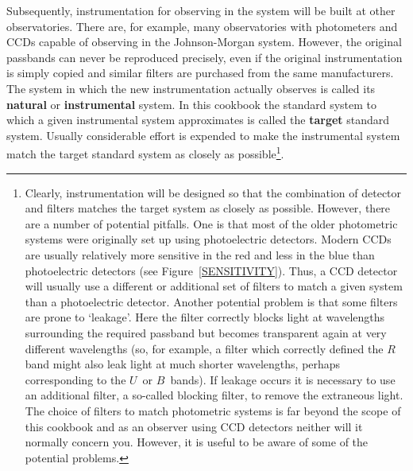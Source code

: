 \documentclass[twoside,11pt]{article}
\begin{document}
Subsequently, instrumentation for observing in the system will be built
at other observatories.  There are, for example, many observatories
with photometers and CCDs capable of observing in the Johnson-Morgan
system.  However, the original passbands can never be reproduced
precisely, even if the original instrumentation is simply copied and
similar filters are purchased from the same manufacturers.  The system
in which the new instrumentation actually observes is called its
{\bf natural} or {\bf instrumental} system.  In this cookbook the
standard system to which a given instrumental system approximates is
called the {\bf target} standard system.  Usually considerable effort
is expended to make the instrumental system  match the target standard
system as closely as possible\footnote{Clearly, instrumentation will be
designed so that the combination of detector and filters matches the
target system as closely as possible.  However, there are a number of
potential pitfalls.  One is that most of the older photometric systems
were originally set up using photoelectric detectors.  Modern CCDs are
usually relatively more sensitive in the red and less in the blue than
photoelectric detectors (see Figure~\ref{SENSITIVITY}).  Thus, a CCD
detector will usually use a different or additional set of filters to
match a given system than a photoelectric detector.  Another potential
problem is that some filters are prone to `leakage'.  Here the filter
correctly blocks light at wavelengths surrounding the required passband
but becomes transparent again at very different wavelengths (so, for example,
a filter which correctly defined the $R$\, band might also leak light at
much shorter wavelengths, perhaps corresponding to the $U$\, or $B$\, bands).
If leakage occurs it is necessary to use an additional filter, a so-called
blocking filter, to remove the extraneous light.  The choice of filters
to match photometric systems is far beyond the scope of this cookbook and
as an observer using CCD detectors neither will it normally concern you.
However, it is useful to be aware of some of the potential problems.}.
\end{document}

